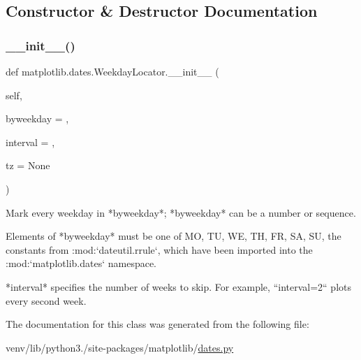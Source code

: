 \subsection{Constructor \& Destructor Documentation}
\mbox{\label{classmatplotlib_1_1dates_1_1WeekdayLocator_a10a6a731e2ec92647cc7de3c1bf68fc3}} 
\subsubsection{\texorpdfstring{\+\_\+\+\_\+init\+\_\+\+\_\+()}{\_\_init\_\_()}}
{\footnotesize\ttfamily def matplotlib.\+dates.\+Weekday\+Locator.\+\_\+\+\_\+init\+\_\+\+\_\+ (\begin{DoxyParamCaption}\item[{}]{self,  }\item[{}]{byweekday = {},  }\item[{}]{interval = {},  }\item[{}]{tz = {\ttfamily None} }\end{DoxyParamCaption})}

\begin{DoxyVerb}Mark every weekday in *byweekday*; *byweekday* can be a number or
sequence.

Elements of *byweekday* must be one of MO, TU, WE, TH, FR, SA,
SU, the constants from :mod:`dateutil.rrule`, which have been
imported into the :mod:`matplotlib.dates` namespace.

*interval* specifies the number of weeks to skip.  For example,
``interval=2`` plots every second week.
\end{DoxyVerb}
 

The documentation for this class was generated from the following file\+:\begin{DoxyCompactItemize}
\item 
venv/lib/python3./site-\/packages/matplotlib/\hyperlink{dates_8py}{dates.\+py}\end{DoxyCompactItemize}
